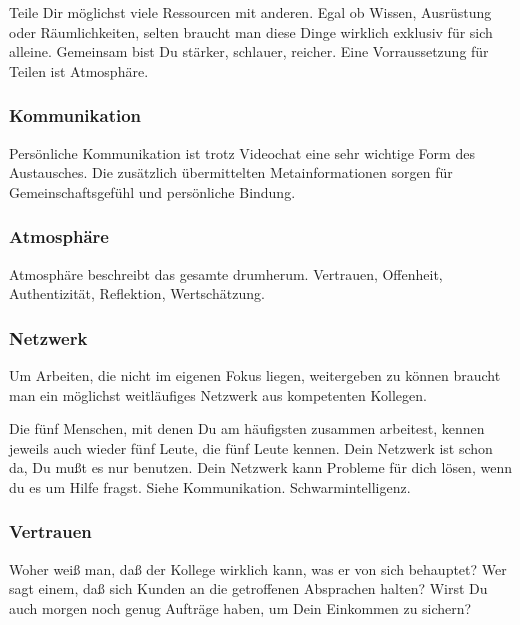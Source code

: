 {{Teile Dir möglichst viele Ressourcen mit anderen.
%
Egal ob Wissen, Ausrüstung oder Räumlichkeiten, selten braucht man diese Dinge wirklich exklusiv für sich alleine.
%
Gemeinsam bist Du stärker, schlauer, reicher.
%
Eine Vorraussetzung für Teilen ist Atmosphäre.


     \subsubsection{Kommunikation}
Persönliche Kommunikation ist trotz Videochat eine sehr wichtige Form des Austausches.
%
Die zusätzlich übermittelten Metainformationen sorgen für Gemeinschaftsgefühl und persönliche Bindung.


   \subsubsection{Atmosphäre}
Atmosphäre beschreibt das gesamte drumherum.
%
Vertrauen, Offenheit, Authentizität, Reflektion, Wertschätzung.



\subsubsection{Netzwerk}
\begin{em}
Um Arbeiten, die nicht im eigenen Fokus liegen, weitergeben zu können braucht man ein möglichst 
weitläufiges Netzwerk aus kompetenten Kollegen.
\end{em}



Die fünf Menschen, mit denen Du am häufigsten zusammen arbeitest, kennen jeweils auch wieder fünf 
Leute, die fünf Leute kennen.
%
Dein Netzwerk ist schon da, Du mußt es nur benutzen.
%
Dein Netzwerk kann Probleme für dich lösen, wenn du es um Hilfe fragst.
%
Siehe Kommunikation. Schwarmintelligenz.
   



\subsubsection{Vertrauen}
\begin{em}
Woher weiß man, daß der Kollege wirklich kann, was er von sich behauptet? Wer sagt einem, daß sich Kunden an die getroffenen Absprachen halten? Wirst Du auch morgen noch genug Aufträge haben, um Dein Einkommen zu sichern?
\end{em}



}}
